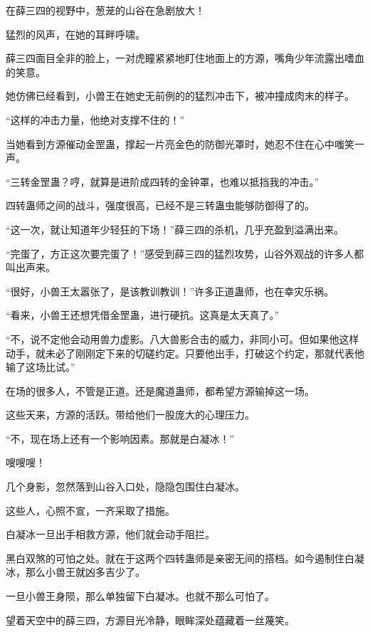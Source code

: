 
\begin{this_body}

在薛三四的视野中，葱茏的山谷在急剧放大！

猛烈的风声，在她的耳畔呼啸。

薛三四面目全非的脸上，一对虎瞳紧紧地盯住地面上的方源，嘴角少年流露出嗜血的笑意。

她仿佛已经看到，小兽王在她史无前例的的猛烈冲击下，被冲撞成肉末的样子。

“这样的冲击力量，他绝对支撑不住的！”

当她看到方源催动金罡蛊，撑起一片亮金色的防御光罩时，她忍不住在心中嗤笑一声。

“三转金罡蛊？哼，就算是进阶成四转的金钟罩，也难以抵挡我的冲击。”

四转蛊师之间的战斗，强度很高，已经不是三转蛊虫能够防御得了的。

“这一次，就让知道年少轻狂的下场！”薛三四的杀机，几乎充盈到溢满出来。

“完蛋了，方正这次要完蛋了！”感受到薛三四的猛烈攻势，山谷外观战的许多人都叫出声来。

“很好，小兽王太嚣张了，是该教训教训！”许多正道蛊师，也在幸灾乐祸。

“看来，小兽王还想凭借金罡蛊，进行硬抗。这真是太天真了。”

“不，说不定他会动用兽力虚影。八大兽影合击的威力，非同小可。但如果他这样动手，就未必了刚刚定下来的切磋约定。只要他出手，打破这个约定，那就代表他输了这场比试。”

在场的很多人，不管是正道。还是魔道蛊师，都希望方源输掉这一场。

这些天来，方源的活跃。带给他们一股庞大的心理压力。

“不，现在场上还有一个影响因素。那就是白凝冰！”

嗖嗖嗖！

几个身影，忽然落到山谷入口处，隐隐包围住白凝冰。

这些人，心照不宣，一齐采取了措施。

白凝冰一旦出手相救方源，他们就会动手阻拦。

黑白双煞的可怕之处。就在于这两个四转蛊师是亲密无间的搭档。如今遏制住白凝冰，那么小兽王就凶多吉少了。

一旦小兽王身陨，那么单独留下白凝冰。也就不那么可怕了。

望着天空中的薛三四，方源目光冷静，眼眸深处蕴藏着一丝蔑笑。


\end{this_body}
